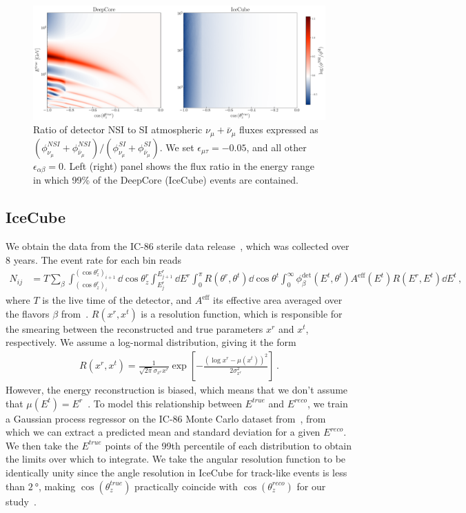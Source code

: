 \documentclass[draft=True]{revtex4-2}
\newcommand{\zreco}{\ensuremath{\cos{(\theta_z^{reco})}}}
\newcommand{\ztrue}{\ensuremath{\cos{(\theta_z^{true})}}}
\newcommand{\emt}{\ensuremath{\epsilon_{\mu\tau}}}
\newcommand{\Ereco}{E^{reco}}
\newcommand{\Etrue}{E^{true}}
\begin{document}
\begin{figure}[!tb]
   \begin{center}
      \includegraphics[width=0.8\linewidth]{figures/flux_ratio.pdf}
   \end{center}
   \caption{Ratio of detector NSI to SI atmospheric $\nu_\mu + \bar{\nu}_\mu$ fluxes expressed as $(\phi_{\nu_\mu}^{NSI} + \phi_{\bar\nu_\mu}^{NSI})/(\phi_{\nu_\mu}^{SI} + \phi_{\bar\nu_\mu}^{SI})$.
   We set $\emt = -0.05$, and all other $\epsilon_{\alpha\beta}=0$. 
   Left (right) panel shows the flux ratio in the energy range in which 99\% of the DeepCore (IceCube) events are contained.
   }\label{fig:flux_ratio}
\end{figure}%

\subsection{IceCube}\label{ch:ICmethod}
We obtain the data from the IC-86 sterile data release~\cite{IC2020}, which was collected over 8 years. The event rate for each bin reads
\begin{align}\label{eq:ICevents}
   N_{ij} &= T\sum_\beta \int_{(\cos{\theta_z^r})_i}^{(\cos{\theta_z^r})_{i+1}} \dd \cos{\theta^r_z} \int_{E^r_{j}}^{E^r_{j+1}} \dd E^r \int_0^\pi R(\theta^r,\theta^t) \dd \cos{\theta^t} \int_0^\infty \phi_\beta^\text{det}(E^t,\theta^t)  A^\text{eff}(E^t) R(E^r,E^t) 
   \dd E^t\,,
\end{align}
where $T$ is the live time of the detector, and $A^\text{eff}$ its effective area averaged over the flavors $\beta$ from~\cite{ICaeff}. $R(x^r,x^t)$ is a resolution function, 
which is responsible for the smearing between the reconstructed and true parameters $x^r$ and $x^t$, respectively. We assume a log-normal distribution, giving it the form 
\begin{align}
    R(x^r, x^t) = \frac{1}{\sqrt{2\pi} \sigma_{x^r}x^r} \exp\left[-\frac{(\log x^r-\mu(x^t))^2}{2\sigma_{x^r}^2}\right]\,.
\end{align}
However, the energy reconstruction is biased, which means that we don't assume that $\mu(E^t) =E^r$~\cite{weaverEvidenceAstrophysicalMuon}. 
To model this relationship between $\Etrue$ and $\Ereco$, we train a Gaussian process regressor on the IC-86 Monte Carlo dataset from~\cite{IC2016}, from which
we can extract a predicted mean and standard deviation for a given $E^{reco}$. We then take the $\Etrue$ points of the 99th percentile of each distribution to obtain
the limits over which to integrate. We take the angular resolution function to be identically unity since the angle resolution in IceCube for track-like 
events is less than $\SI{2}{\degree}$, making $\ztrue$ practically coincide with $\zreco$ for our study~\cite{IC2020}. 
\end{document}
